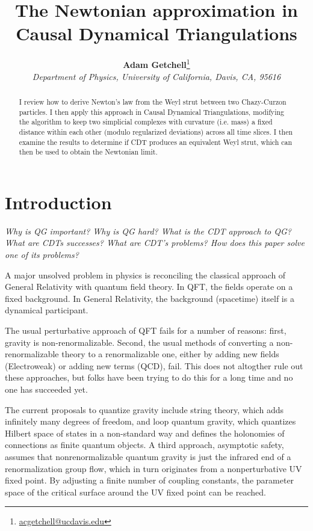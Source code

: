 \documentclass[12pt]{article}
\title{The Newtonian approximation in Causal Dynamical Triangulations}
\author{\textbf{Adam Getchell}\footnote{\href{mailto:acgetchell@ucdavis.edu}{acgetchell@ucdavis.edu}}\\\textit{Department of Physics, University of California, Davis, CA, 95616}}
\begin{document}
\maketitle

\begin{abstract}
I review how to derive Newton's law from the Weyl strut between two Chazy-Curzon particles. I then apply this approach in Causal Dynamical Triangulations, modifying the algorithm to keep two simplicial complexes with curvature (i.e. mass) a fixed distance within each other (modulo regularized deviations) across all time slices. I then examine the results to determine if CDT produces an equivalent Weyl strut, which can then be used to obtain the Newtonian limit.
\end{abstract}

\section{Introduction}

\textit{Why is QG important? Why is QG hard? What is the CDT approach to QG? What are CDTs successes? What are CDT's problems? How does this paper solve one of its problems?}

A major unsolved problem in physics is reconciling the classical approach of General Relativity with quantum field theory. In QFT, the fields operate on a fixed background. In General Relativity, the background (spacetime) itself is a dynamical participant.

The usual perturbative approach of QFT fails for a number of reasons: first, gravity is non-renormalizable. Second, the usual methods of converting a non-renormalizable theory to a renormalizable one, either by adding new fields (Electroweak) or adding new terms (QCD), fail. This does not altogther rule out these approaches, but folks have been trying to do this for a long time and no one has succeeded yet.

The current proposals to quantize gravity include string theory, which adds infinitely many degrees of freedom, and loop quantum gravity, which quantizes Hilbert space of states in a non-standard way and defines the holonomies of connections as finite quantum objects. A third approach, asymptotic safety, assumes that nonrenormalizable quantum gravity is just the infrared end of a renormalization group flow, which in turn originates from a nonperturbative UV fixed point. By adjusting a finite number of coupling constants, the parameter space of the critical surface around the UV fixed point can be reached.
\end{document}
